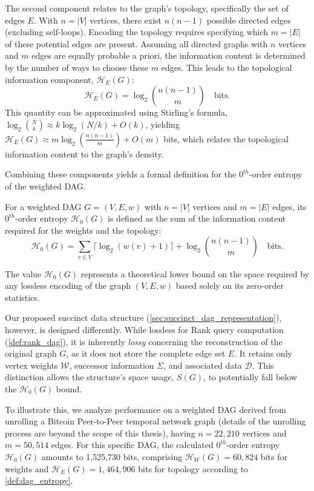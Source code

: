 The second component relates to the graph's topology, specifically the set of edges $E$. With $n = |V|$ vertices, there exist $n(n-1)$ possible directed edges (excluding self-loops). Encoding the topology requires specifying which $m = |E|$ of these potential edges are present. Assuming all directed graphs with $n$ vertices and $m$ edges are equally probable a priori, the information content is determined by the number of ways to choose these $m$ edges. This leads to the topological information component, $\mathcal{H}_E(G)$:
\[ \mathcal{H}_E(G) = \log_2 \binom{n(n-1)}{m} \quad \text{bits}. \]
This quantity can be approximated using Stirling's formula, $\log_2 \binom{N}{k} \approx k \log_2(N/k) + O(k)$, yielding $\mathcal{H}_E(G) \approx m \log_2 \left( \frac{n(n-1)}{m} \right) + O(m)$ bits, which relates the topological information content to the graph's density.

Combining these components yields a formal definition for the $0^{th}$-order entropy of the weighted DAG.

\begin{definition}
    \label{def:dag_entropy}
    For a weighted DAG $G = (V, E, w)$ with $n=|V|$ vertices and $m=|E|$ edges, its $0^{th}$-order entropy $\mathcal{H}_0(G)$ is defined as the sum of the information content required for the weights and the topology:
    \[ \mathcal{H}_0(G) = \sum_{v \in V} \lceil \log_2 (w(v)+1) \rceil + \log_2 \binom{n(n-1)}{m} \quad \text{bits}. \]
\end{definition}

The value $\mathcal{H}_0(G)$ represents a theoretical lower bound on the space required by any lossless encoding of the graph $(V, E, w)$ based solely on its zero-order statistics.

Our proposed succinct data structure (\autoref{sec:succinct_dag_representation}), however, is designed differently. While lossless for Rank query computation (\autoref{def:rank_dag}), it is inherently \emph{lossy} concerning the reconstruction of the original graph $G$, as it does not store the complete edge set $E$. It retains only vertex weights $\mathcal{W}$, successor information $\Sigma$, and associated data $\mathcal{D}$. This distinction allows the structure's space usage, $S(G)$, to potentially fall below the $\mathcal{H}_0(G)$ bound.

To illustrate this, we analyze performance on a weighted DAG derived from unrolling a Bitcoin Peer-to-Peer temporal network graph (details of the unrolling process are beyond the scope of this thesis), having $n = 22,210$ vertices and $m = 50,514$ edges. For this specific DAG, the calculated $0^{th}$-order entropy $\mathcal{H}_0(G)$ amounts to 1,525,730 bits, comprising $\mathcal{H}_W(G) = 60,824$ bits for weights and $\mathcal{H}_E(G) = 1,464,906$ bits for topology according to \autoref{def:dag_entropy}.

